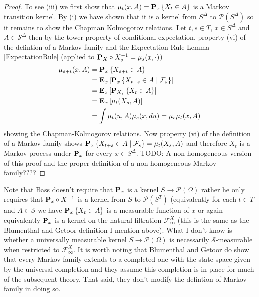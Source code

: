 \begin{proof}
To see (iii) we first show that $\mu_t(x,A) = \sprobability{X_t \in A}{x}$ is a Markov transition kernel.  By (i) we have shown that it is a kernel from $S^\Delta$ to $\mathcal{P}(S^\Delta)$ so it remains to show the Chapman Kolmogorov relations.  Let $t,s \in T$, $x \in S^\Delta$ and $A \in \mathcal{S}^\Delta$ then by the tower property of conditional expectation, property (vi) of the defintion of a Markov family and the Expectation Rule Lemma \ref{ExpectationRule} (applied to $\pushforward{X_s}{\probabilityop_X} = \mu_s(x, \cdot)$)
\begin{align*}
\mu_{s+t}(x, A) &= \sprobability{X_{s+t} \in A}{x} \\
&=\sexpectation{\csprobability{\mathcal{F}_s}{X_{t+s} \in A}{x}}{x} \\
&=\sexpectation{\sprobability{X_{t} \in A}{X_s}}{x} \\
&=\sexpectation{\mu_t(X_s, A)}{x} \\
&=\int \mu_t(u, A) \mu_s(x, du) = \mu_s \mu_t (x, A) \\
\end{align*}
showing the Chapman-Kolmogorov relations.  Now property (vi) of the definition of a Markov family shows $\csprobability{\mathcal{F}_s}{X_{t+s} \in A}{x} = \mu_t(X_s,A)$ and
therefore $X_t$ is a Markov process under $\probabilityop_x$ for every $x \in S^\Delta$.
TODO: A non-homogeneous version of this proof and the proper definition of a non-homogeneous Markov family????
\end{proof}

Note that Bass doesn't require that $\probabilityop_x$ is a kernel $S\to \mathcal{P}(\Omega)$ rather he only requires that
$\pushforward{X}{\probabilityop_x}$ is a kernel from $S$ to
$\mathcal{P}(S^T)$ (equivalently for each $t \in T$ and $A \in \mathcal{S}$ we have
$\sprobability{X_t \in A}{x}$ is a measurable function of $x$ or again
equivalently $\probabilityop_x$ is a kernel on the natural filtration
$\mathcal{F}^X_\infty$ (this is the same as the Blumenthal and Getoor definition I mention above).  What I don't know is whether a universally
measurable kernel $S \to  \mathcal{P}(\Omega)$ is necessarily 
$\mathcal{S}$-measurable when restricted to $\mathcal{F}^X_\infty$.  It is worth noting that Blumenthal and Getoor do show that every Markov family extends to a completed one with 
the state space given by the universal completion and they assume this completion is in place for much of the subsequent theory.  That said, they
don't modify the defintion of Markov family in doing so.

